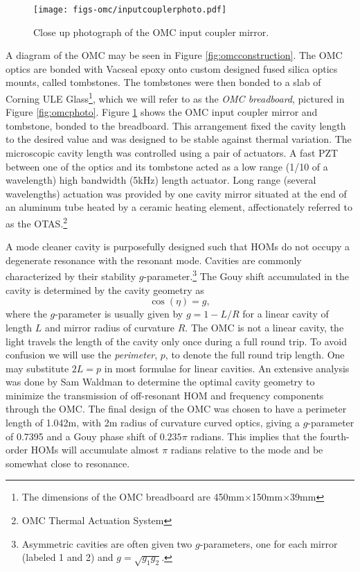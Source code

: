 \begin{figure}
  \begin{center}
  \leavevmode
  \texttt{[image: figs-omc/inputcouplerphoto.pdf]}
  \end{center}
  \caption[Close up photograph of the OMC input coupler mirror.]{Close up photograph of the OMC input coupler mirror.}
  \label{fig:inputcouplerphoto}
\end{figure}

A diagram of the OMC may be seen in Figure \ref{fig:omcconstruction}. %
The OMC optics are bonded with Vacseal epoxy onto custom designed fused silica optics mounts, called tombstones. %
 The tombstones were then bonded to a slab of Corning ULE Glass\footnote{The dimensions of the OMC breadboard are 450mm$\times$150mm$\times$39mm}, which we will refer to as the \emph{OMC breadboard}, pictured in Figure \ref{fig:omcphoto}. %
Figure \ref{fig:inputcouplerphoto} shows the OMC input coupler mirror and tombstone, bonded to the breadboard. %
This arrangement fixed the cavity length to the desired value and was designed to be stable against thermal variation. %
The microscopic cavity length was controlled using a pair of actuators. %
A fast PZT between one of the optics and its tombstone acted as a low range (1/10 of a wavelength) high bandwidth (5kHz) length actuator. %
Long range (several wavelengths) actuation was provided by one cavity mirror situated at the end of an aluminum tube heated by a ceramic heating element, affectionately referred to as the OTAS.\footnote{OMC Thermal Actuation System}

A mode cleaner cavity is purposefully designed such that HOMs do not occupy a degenerate resonance with the resonant  mode. %
Cavities are commonly characterized by their stability $g$-parameter.\footnote{Asymmetric cavities are often given two $g$-parameters, one for each mirror (labeled 1 and 2) and $g=\sqrt{g_1 g_2}$.} The Gouy shift accumulated in the cavity is determined by the cavity geometry as
\begin{equation}
\label{eqn:gouyg}
\cos(\eta)=g,
\end{equation}
where the $g$-parameter is usually given by $g=1-L/R$ for a linear cavity of length $L$ and mirror radius of curvature $R$.\cite{T080208} The OMC is not a linear cavity, the light travels the length of the cavity only once during a full round trip. %
To avoid confusion we will use the \emph{perimeter}, $p$, to denote the full round trip length. %
One may substitute $2L=p$ in most formulae for linear cavities. %
An extensive analysis was done by Sam Waldman to determine the optimal cavity geometry to minimize the transmission of off-resonant HOM and frequency components through the OMC.\cite{T080144} The final design of the OMC was chosen to have a perimeter length of 1.042m, with 2m radius of curvature curved optics, giving a $g$-parameter of 0.7395 and a Gouy phase shift of $0.235\pi$ radians. %
This implies that the fourth-order HOMs will accumulate almost $\pi$ radians relative to the  mode and be somewhat close to resonance.

